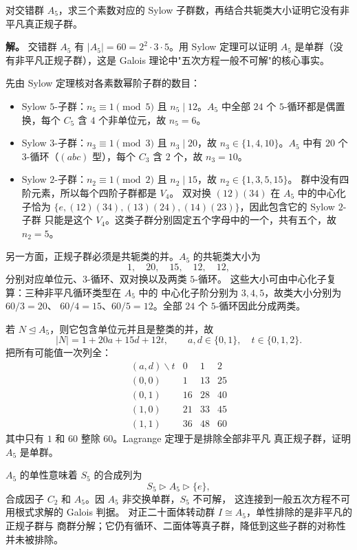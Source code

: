 \begin{example}
\label{ex:a5-simplicity}
对交错群 $A_5$，求三个素数对应的 Sylow 子群数，再结合共轭类大小证明它没有非平凡真正规子群。

\textbf{解。} 交错群 $A_5$ 有 $|A_5|=60=2^2\cdot3\cdot5$。用 Sylow 定理可以证明 $A_5$ 是单群（没有非平凡正规子群），这是 Galois 理论中"五次方程一般不可解"的核心事实。

先由 Sylow 定理核对各素数幂阶子群的数目：
\begin{itemize}
\item Sylow $5$-子群：$n_5\equiv1\pmod5$ 且 $n_5\mid12$。$A_5$ 中全部 $24$ 个 $5$-循环都是偶置换，每个 $C_5$ 含 $4$ 个非单位元，故 $n_5=6$。
\item Sylow $3$-子群：$n_3\equiv1\pmod3$ 且 $n_3\mid20$，故 $n_3\in\{1,4,10\}$。$A_5$ 中有 $20$ 个 $3$-循环（$(abc)$ 型），每个 $C_3$ 含 $2$ 个，故 $n_3=10$。
\item Sylow $2$-子群：$n_2\equiv1\pmod2$ 且 $n_2\mid15$，故 $n_2\in\{1,3,5,15\}$。
群中没有四阶元素，所以每个四阶子群都是 $V_4$。
双对换 $(12)(34)$ 在 $A_5$ 中的中心化子恰为
$\{e,(12)(34),(13)(24),(14)(23)\}$，因此包含它的 Sylow $2$-子群
只能是这个 $V_4$。这类子群分别固定五个字母中的一个，共有五个，故 $n_2=5$。
\end{itemize}

另一方面，正规子群必须是共轭类的并。$A_5$ 的共轭类大小为
\[
1,\quad 20,\quad 15,\quad 12,\quad 12,
\]
分别对应单位元、$3$-循环、双对换以及两类 $5$-循环。
这些大小可由中心化子复算：三种非平凡循环类型在 $A_5$ 中的
中心化子阶分别为 $3,4,5$，故类大小分别为 $60/3=20$、
$60/4=15$、$60/5=12$。全部 $24$ 个 $5$-循环因此分成两类。

若 $N\mathrel{\trianglelefteq} A_5$，则它包含单位元并且是整类的并，故
\[
|N|=1+20a+15d+12t,
\qquad a,d\in\{0,1\},\quad t\in\{0,1,2\}.
\]
把所有可能值一次列全：
\[
\begin{array}{c|ccc}
(a,d)\backslash t&0&1&2\\\hline
(0,0)&1&13&25\\
(0,1)&16&28&40\\
(1,0)&21&33&45\\
(1,1)&36&48&60
\end{array}
\]
其中只有 $1$ 和 $60$ 整除 $60$。Lagrange 定理于是排除全部非平凡
真正规子群，证明 $A_5$ 是单群。

$A_5$ 的单性意味着 $S_5$ 的合成列为
\[
S_5\rhd A_5\rhd\{e\},
\]
合成因子 $C_2$ 和 $A_5$。因 $A_5$ 非交换单群，$S_5$ 不可解，
这连接到一般五次方程不可用根式求解的 Galois 判据。
对正二十面体转动群 $I\cong A_5$，单性排除的是非平凡的正规子群与
商群分解；它仍有循环、二面体等真子群，降低到这些子群的对称性并未被排除。
\end{example}


